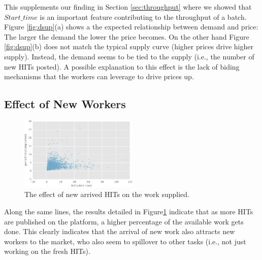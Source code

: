 This supplements our finding in Section \ref{sec:throughput} where we showed that $Start\_time$ is an important feature contributing to the throughput of a batch.
Figure \ref{fig:dsup}(a) shows a the expected relationship between demand and price: The larger the demand the lower the price becomes. On the other hand Figure \ref{fig:dsup}(b)  does not match the typical supply curve (higher prices drive higher supply). Instead, the demand seems to be tied to  the supply (i.e., the number of new HITs posted). A possible explanation to this effect is the lack of biding  mechanisms that the workers can leverage to drive prices up.

\subsection{Effect of New Workers}
\begin{figure}[ht]
	\centering
		\includegraphics[width=0.5\textwidth]{figures/percHitsCompleted}
	\caption{The effect of new arrived HITs on the work  supplied.}
	\label{fig:perc_hits_completed}
\end{figure}
Along the same lines, the results detailed in Figure\ref{fig:perc_hits_completed} indicate that as more HITs are published on the platform, a higher percentage of the available work gets done. 
This clearly indicates that the arrival of new work also attracts new workers
to the market, who also seem to spillover to other tasks (i.e., not just working on the fresh HITs).


